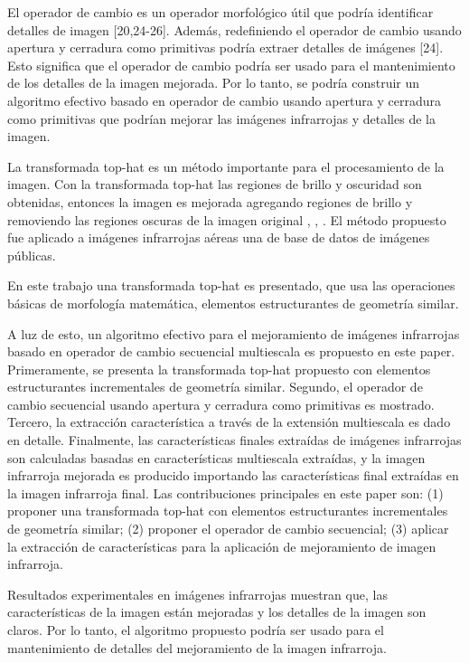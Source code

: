 \documentclass[a4paper, 11 pt, conference]{ieeeconf}      %
\begin{document}
El operador de cambio es un operador morfol\'ogico \'util que podr\'ia identificar detalles de imagen [20,24-26]. Adem\'as, redefiniendo el operador de cambio usando apertura y cerradura como primitivas podr\'ia extraer detalles de im\'agenes [24]. Esto significa que el operador de cambio podr\'ia ser usado para el mantenimiento de los detalles de la imagen mejorada. Por lo tanto, se podr\'ia construir un algoritmo efectivo basado en operador de cambio usando apertura y cerradura como primitivas que podr\'ian mejorar las im\'agenes infrarrojas y detalles de la imagen. 

La transformada top-hat es un m\'etodo importante para el procesamiento de la imagen. Con la transformada top-hat las regiones de brillo y oscuridad son obtenidas, entonces la imagen es mejorada agregando regiones de brillo y removiendo las regiones oscuras de la imagen original \cite{12}, \cite{14}, \cite{15}. El m\'etodo propuesto fue aplicado a im\'agenes infrarrojas a\'ereas una de base de datos de im\'agenes p\'ublicas.

En este trabajo una transformada top-hat es presentado, que usa las operaciones b\'asicas de morfolog\'ia matem\'atica, elementos estructurantes de geometr\'ia similar.

A luz de esto, un algoritmo efectivo para el mejoramiento de im\'agenes infrarrojas basado en operador de cambio secuencial multiescala es propuesto en este paper. Primeramente, se presenta la transformada top-hat propuesto con elementos estructurantes incrementales de geometr\'ia similar. Segundo, el operador de cambio secuencial usando apertura y cerradura como primitivas es mostrado. Tercero, la extracci\'on caracter\'istica a trav\'es de la extensi\'on multiescala es dado en detalle. Finalmente, las caracter\'isticas finales extra\'idas de im\'agenes infrarrojas son calculadas basadas en caracter\'isticas multiescala extra\'idas, y la imagen infrarroja mejorada es producido importando las caracter\'isticas final extra\'idas en la imagen infrarroja final. Las contribuciones principales en este paper son: (1) proponer una transformada top-hat con elementos estructurantes incrementales de geometr\'ia similar; (2) proponer el operador de cambio secuencial; (3) aplicar la extracci\'on de caracter\'isticas para la aplicaci\'on de mejoramiento de imagen infrarroja.

Resultados experimentales en im\'agenes infrarrojas muestran que, las caracter\'isticas de la imagen est\'an mejoradas y los detalles de la imagen son claros. Por lo tanto, el algoritmo propuesto podr\'ia ser usado para el mantenimiento de detalles del mejoramiento de la imagen infrarroja.
\\
\end{document}
